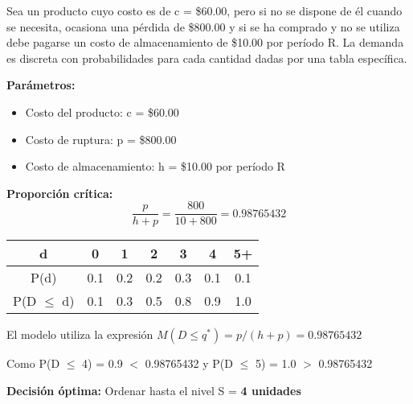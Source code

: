 \documentclass[12pt,a4paper]{book}
\begin{document}
	\begin{tcolorbox}[enhanced,colback=violetaclaro,colframe=moradoacento,boxrule=2pt,arc=8pt,
		drop shadow,title={\bfseries\color{white} \faPuzzlePiece\ PROBLEMA}]
		
		Sea un producto cuyo costo es de c = \$60.00, pero si no se dispone de él cuando se necesita, ocasiona una pérdida de \$800.00 y si se ha comprado y no se utiliza debe pagarse un costo de almacenamiento de \$10.00 por período R. La demanda es discreta con probabilidades para cada cantidad dadas por una tabla específica.
		
	\end{tcolorbox}
	
	\begin{tcolorbox}[enhanced,colback=azulclaro,colframe=azulprincipal,boxrule=2pt,arc=8pt,
		title={\bfseries\color{white} \faCalculator\ SOLUCIÓN}]
		
		\textbf{Parámetros:}
		\begin{itemize}[leftmargin=*,label=\textcolor{azulprincipal}{\faArrowRight}]
			\item Costo del producto: c = \$60.00
			\item Costo de ruptura: p = \$800.00
			\item Costo de almacenamiento: h = \$10.00 por período R
		\end{itemize}
		
		\textbf{Proporción crítica:}
		\begin{equation}
			\frac{p}{h + p} = \frac{800}{10 + 800} = 0.98765432
		\end{equation}
		
		\begin{center}
			\small
			\begin{tabular}{|c|c|c|c|c|c|c|}
				\hline
				\rowcolor{azulclaro}
				\textbf{d} & \textbf{0} & \textbf{1} & \textbf{2} & \textbf{3} & \textbf{4} & \textbf{5+} \\
				\hline
				P(d) & 0.1 & 0.2 & 0.2 & 0.3 & 0.1 & 0.1 \\
				\hline
				P(D $\leq$ d) & 0.1 & 0.3 & 0.5 & 0.8 & 0.9 & 1.0 \\
				\hline
			\end{tabular}
		\end{center}
		
		El modelo utiliza la expresión $M(D \leq q^*) = p/(h + p) = 0.98765432$
		
		Como P(D $\leq$ 4) = 0.9 $<$ 0.98765432 y P(D $\leq$ 5) = 1.0 $>$ 0.98765432
		
		\textbf{Decisión óptima:} Ordenar hasta el nivel S = \textbf{4 unidades}
		
	\end{tcolorbox}
	
\end{document}
